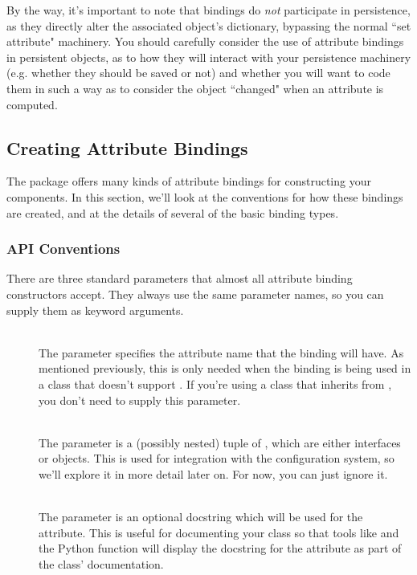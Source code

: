 \begin{verbatim%
}
\begin{verbatim%
}
\begin{verbatim%
}
\begin{verbatim%
}
\begin{verbatim%
}
\begin{verbatim%
}
\begin{verbatim%
}
\begin{verbatim%
}
\begin{verbatim%
}
By the way, it's important to note that bindings do \emph{not} participate in
persistence, as they directly alter the associated object's dictionary,
bypassing the normal ``set attribute" machinery.  You should carefully
consider the use of attribute bindings in persistent objects, as to how they
will interact with your persistence machinery (e.g. whether they should be
saved or not) and whether you will want to code them in such a way as to
consider the object ``changed" when an attribute is computed.




\subsection{Creating Attribute Bindings}

The  package offers many kinds of attribute bindings for
constructing your components.  In this section, we'll look at the conventions
for how these bindings are created, and at the details of several of the basic
binding types.

\subsubsection{API Conventions}

There are three standard parameters that almost all attribute binding
constructors accept.  They always use the same parameter names, so you can
supply them as keyword arguments.

\begin{description}

\item[] \hfill \\
The  parameter specifies the attribute name that the binding will
have.  As mentioned previously, this is only needed when the binding is being
used in a class that doesn't support .  If you're using
a class that inherits from , you don't need to supply this
parameter.

\item[] \hfill \\
The  parameter is a (possibly nested) tuple of
, which are either interfaces or 
objects.  This is used for integration with the configuration system, so we'll 
explore it in more detail later on.  For now, you can just ignore it.

\item[] \hfill \\
The  parameter is an optional docstring which will be used for the
attribute.  This is useful for documenting your class so that tools like
 and the Python  function will display the
docstring for the attribute as part of the class' documentation.


\end{description}
\end{verbatim%
}
\end{verbatim%
}
\end{verbatim%
}
\end{verbatim%
}
\end{verbatim%
}
\end{verbatim%
}
\end{verbatim%
}
\end{verbatim%
}
\end{verbatim%
}

